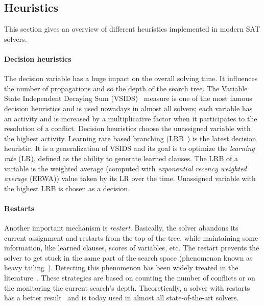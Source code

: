  
 
\subsection{Heuristics}\label{sec:heuristics}
This section gives an overview of different heuristics implemented in modern SAT solvers.
\paragraph{Decision heuristics}
 The decision variable has a huge impact on the 
overall solving time. It influences the number of propagations and so 
the depth of the search tree.
 The Variable State Independent Decaying Sum (VSIDS)~\cite{moskewicz2001chaff} measure is one of the most famous decision heuristics and is used
nowadays in almost all solvers; each variable has an activity and  is increased by a multiplicative factor 
when it participates to the resolution of a conflict.
Decision heuristics choose the unassigned variable with the highest activity.
Learning rate based branching (LRB~\cite{liang2016learning}) is the latest decision heuristic. It is a
generalization of VSIDS and its goal is to optimize the \emph{learning rate} (LR), defined as the ability to generate
learned clauses. The LRB of a variable is the weighted average (computed with \emph{exponential recency
weighted average} (ERWA))  value taken by its LR over the time. Unassigned variable with the highest LRB is chosen as a decision. 

\paragraph{Restarts}
Another important mechanism is \emph{restart}. Basically, the solver abandons its current assignment and 
restarts from the top of the tree, while maintaining some information, like learned clauses, scores of variables, etc.
 The restart prevents the solver to get stuck in the same part of the search space (phenomenon known as heavy tailing~\cite{gomes1997heavy}).
Detecting this phenomenon has been widely treated in the literature~\cite{audemard2012refining,biere2008adaptive}.
These strategies are based on counting the number of conflicts or on the monitoring the current search’s depth.
Theoretically, a solver with restarts has a better result~\cite{huang2007effect} and is today
used in almost all state-of-the-art solvers.

